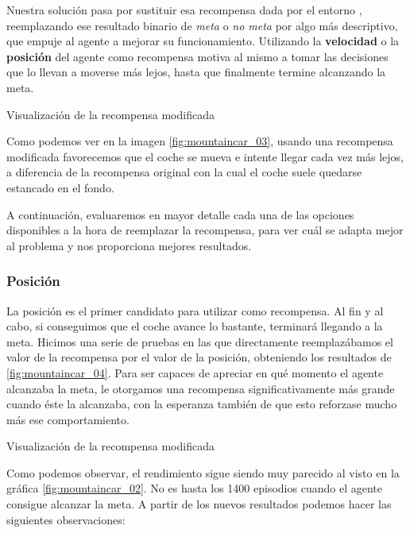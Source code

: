 Nuestra solución pasa por sustituir esa recompensa dada por el entorno \citep{mediumTim}, reemplazando ese resultado binario de \textit{meta} o \textit{no meta} por algo más descriptivo, que empuje al agente a mejorar su funcionamiento. Utilizando la \textbf{velocidad} o la \textbf{posición} del agente como recompensa motiva al mismo a tomar las decisiones que lo llevan a moverse más lejos, hasta que finalmente termine alcanzando la meta.

%
       {Visualización de la recompensa modificada}

Como podemos ver en la imagen \ref{fig:mountaincar_03}, usando una recompensa modificada favorecemos que el coche se mueva e intente llegar cada vez más lejos, a diferencia de la recompensa original con la cual el coche suele quedarse estancado en el fondo.

A continuación, evaluaremos en mayor detalle cada una de las opciones disponibles a la hora de reemplazar la recompensa, para ver cuál se adapta mejor al problema y nos proporciona mejores resultados.


\subsubsection*{Posición}

La posición es el primer candidato para utilizar como recompensa. Al fin y al cabo, si conseguimos que el coche avance lo bastante, terminará llegando a la meta. Hicimos una serie de pruebas en las que directamente reemplazábamos el valor de la recompensa por el valor de la posición, obteniendo los resultados de \ref{fig:mountaincar_04}. Para ser capaces de apreciar en qué momento el agente alcanzaba la meta, le otorgamos una recompensa significativamente más grande cuando éste la alcanzaba, con la esperanza también de que esto reforzase mucho más ese comportamiento.

%
       {Visualización de la recompensa modificada}

Como podemos observar, el rendimiento sigue siendo muy parecido al visto en la gráfica \ref{fig:mountaincar_02}. No es hasta los 1400 episodios cuando el agente consigue alcanzar la meta. A partir de los nuevos resultados podemos hacer las siguientes observaciones:

